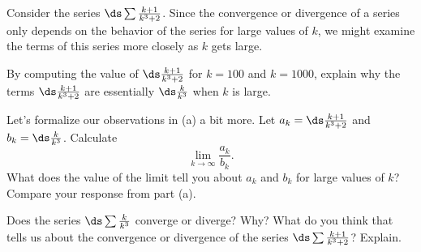 \begin{activity} \label{8.3.Act6} Consider the series $\ds \sum \frac{k+1}{k^3+2}$. Since the convergence or divergence of a series only depends on the behavior of the series for large values of $k$, we might examine the terms of this series more closely as $k$ gets large.
    \ba
    \item By computing the value of $\ds \frac{k+1}{k^3+2}$ for $k = 100$ and $k = 1000$, explain why the terms $\ds \frac{k+1}{k^3+2}$ are essentially $\ds \frac{k}{k^3}$ when $k$ is large. 

    \item Let's formalize our observations in (a) a bit more. Let $a_k = \ds \frac{k+1}{k^3+2}$ and $b_k = \ds \frac{k}{k^3}$. Calculate 
    \[\lim_{k \to \infty} \frac{a_k}{b_k}.\]
    What does the value of the limit tell you about $a_k$ and $b_k$ for large values of $k$? Compare your response from part (a). 

    \item Does the series $\ds \sum \frac{k}{k^3}$ converge or diverge? Why? What do you think that tells us about the convergence or divergence of the series $\ds \sum \frac{k+1}{k^3+2}$? Explain. 

\ea
\end{activity}

